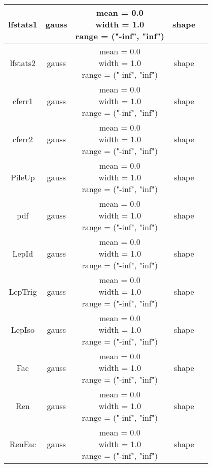 \documentclass{article}
\begin{document}
\begin{center}
\begin{scriptsize}
\begin{tabular}{ | c | c | c | c | c |  }
      \hline
      lfstats1 & gauss & \shortstack{mean = 0.0 \\ width = 1.0 \\ range = ("-inf", "inf")} & shape & \shortstack{} \\
      \hline
      lfstats2 & gauss & \shortstack{mean = 0.0 \\ width = 1.0 \\ range = ("-inf", "inf")} & shape & \shortstack{} \\
      \hline
      cferr1 & gauss & \shortstack{mean = 0.0 \\ width = 1.0 \\ range = ("-inf", "inf")} & shape & \shortstack{} \\
      \hline
      cferr2 & gauss & \shortstack{mean = 0.0 \\ width = 1.0 \\ range = ("-inf", "inf")} & shape & \shortstack{} \\
      \hline
      PileUp & gauss & \shortstack{mean = 0.0 \\ width = 1.0 \\ range = ("-inf", "inf")} & shape & \shortstack{} \\
      \hline
      pdf & gauss & \shortstack{mean = 0.0 \\ width = 1.0 \\ range = ("-inf", "inf")} & shape & \shortstack{} \\
      \hline
      LepId & gauss & \shortstack{mean = 0.0 \\ width = 1.0 \\ range = ("-inf", "inf")} & shape & \shortstack{} \\
      \hline
      LepTrig & gauss & \shortstack{mean = 0.0 \\ width = 1.0 \\ range = ("-inf", "inf")} & shape & \shortstack{} \\
      \hline
      LepIso & gauss & \shortstack{mean = 0.0 \\ width = 1.0 \\ range = ("-inf", "inf")} & shape & \shortstack{} \\
      \hline
      Fac & gauss & \shortstack{mean = 0.0 \\ width = 1.0 \\ range = ("-inf", "inf")} & shape & \shortstack{} \\
      \hline
      Ren & gauss & \shortstack{mean = 0.0 \\ width = 1.0 \\ range = ("-inf", "inf")} & shape & \shortstack{} \\
      \hline
      RenFac & gauss & \shortstack{mean = 0.0 \\ width = 1.0 \\ range = ("-inf", "inf")} & shape & \shortstack{} \\
      \hline

    \hline
    \end{tabular}
  \end{scriptsize}

  \end{center} 
\end{document}
